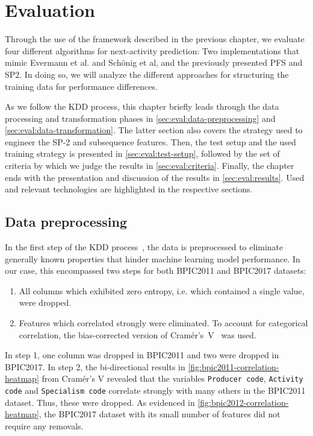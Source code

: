 \chapter{Evaluation}\label{chap:evaluation}
Through the use of the framework described in the previous chapter, we evaluate four different algorithms for next-activity prediction: Two implementations that mimic Evermann et al. and Schönig et al, and the previously presented PFS and SP2. In doing so, we will analyze the different approaches for structuring the training data for performance differences.

As we follow the KDD process, this chapter briefly leads through the data processing and transformation phases in \autoref{sec:eval:data-preprocessing} and \autoref{sec:eval:data-transformation}. The latter section also covers the strategy used to engineer the SP-2 and subsequence features. Then, the test setup and the used training strategy is presented in \autoref{sec:eval:test-setup}, followed by the set of criteria by which we judge the results in \autoref{sec:eval:criteria}. Finally, the chapter ends with the presentation and discussion of the results in \autoref{sec:eval:results}. Used and relevant technologies are highlighted in the respective sections.

\section{Data preprocessing}
\label{sec:eval:data-preprocessing}
In the first step of the KDD process~\cite{fayyad1996data}, the data is preprocessed to eliminate generally known properties that hinder machine learning model performance. In our case, this encompassed two steps for both BPIC2011 and BPIC2017 datasets:

\begin{enumerate}
    \item All columns which exhibited zero entropy, i.e. which contained a single value, were dropped.
    \item Features which correlated strongly were eliminated. To account for categorical correlation, the bias-corrected version of Cramér's~V~\cite{bergsma2013bias} was used.
\end{enumerate}

In step 1, one column was dropped in BPIC2011 and two were dropped in BPIC2017.
In step 2, the bi-directional results in \autoref{fig:bpic2011-correlation-heatmap} from Cramér's V revealed that the variables \texttt{Producer code}, \texttt{Activity code} and \texttt{Specialism code} correlate strongly with many others in the BPIC2011 dataset. Thus, these were dropped. As evidenced in \autoref{fig:bpic2012-correlation-heatmap}, the BPIC2017 dataset with its small number of features did not require any removals.

